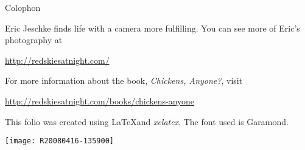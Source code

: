 \pagecolor{textpagecol}
\vspace*{1in}

{\LARGE Colophon}
\vspace*{0.25in}

Eric Jeschke finds life with a camera more fulfilling.
You can see more of Eric's photography at

\url{http://redskiesatnight.com/}

For more information about the book, {\em Chickens, Anyone?}, visit

\url{http://redskiesatnight.com/books/chickens-anyone}

\vspace*{0.25in}

This folio was created using \LaTeX and {\em xelatex}.
The font used is Garamond.

\vspace*{0.5in}

\begin{center}
\texttt{[image: R20080416-135900]}
\end{center}

